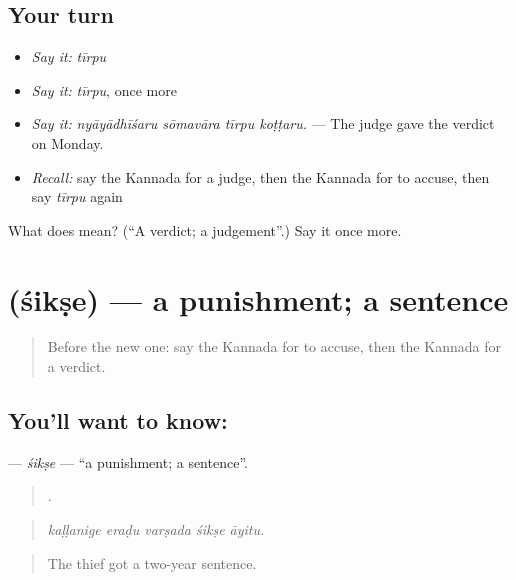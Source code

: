 \subsection*{Your turn}
\begin{itemize}
\raggedright
  \item \emph{Say it:} \emph{tīrpu}
  \item \emph{Say it:} \emph{tīrpu}, once more
  \item \emph{Say it:} \emph{nyāyādhīśaru sōmavāra tīrpu koṭṭaru.} — The judge gave the verdict on Monday.
  \item \emph{Recall:} say the Kannada for a judge, then the Kannada for to accuse, then say \emph{tīrpu} again
\end{itemize}

\begin{tcolorbox}[breakable,colback=teal!4,colframe=teal!35!black,title={Before you move on}]
What does  mean? (\textquotedblleft{}A verdict; a judgement\textquotedblright{}.) Say it once more.
\end{tcolorbox}
\section[\texorpdfstring{\kn{ಶಿಕ್ಷೆ} (śikṣe)}{ಶಿಕ್ಷೆ (śikṣe)}]{ (śikṣe) — a punishment; a sentence}

\label{lesson:KA-C321-sikse}



\begin{quote}
Before the new one: say the Kannada for to accuse, then the Kannada for a verdict.
\end{quote}

\subsection*{You'll want to know: }
\textbf{} — \emph{śikṣe} — \textquotedblleft{}a punishment; a sentence\textquotedblright{}.

\begin{quote}
    .
\end{quote}

\begin{quote}
\emph{kaḷḷanige eraḍu varṣada śikṣe āyitu.}
\end{quote}

\begin{quote}
The thief got a two-year sentence.
\end{quote}

